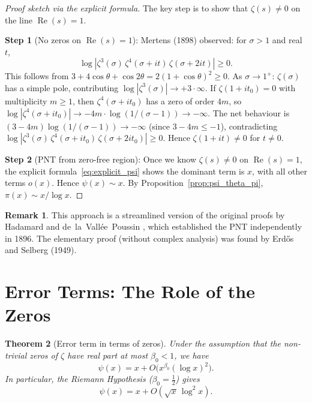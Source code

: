 \documentclass[12pt,a4paper]{amsart}
\newtheorem{theorem}{Theorem}[section]
\theoremstyle{definition}
\newtheorem{remark}[theorem]{Remark}
\DeclareMathOperator{\Re}{Re}
\begin{document}
\begin{proof}[Proof sketch via the explicit formula]
The key step is to show that $\zeta(s) \ne 0$ on the line $\Re(s) = 1$.

\textbf{Step 1} (No zeros on $\Re(s) = 1$):
Mertens (1898) observed: for $\sigma > 1$ and real $t$,
\[
  \log|\zeta^3(\sigma)\,\zeta^4(\sigma+it)\,\zeta(\sigma+2it)| \ge 0.
\]
This follows from $3 + 4\cos\theta + \cos 2\theta = 2(1+\cos\theta)^2 \ge 0$.
As $\sigma \to 1^+$: $\zeta(\sigma)$ has a simple pole, contributing
$\log|\zeta^3(\sigma)| \to +3\cdot\infty$. If $\zeta(1+it_0) = 0$ with
multiplicity $m \geq 1$, then $\zeta^4(\sigma+it_0)$ has a zero of order $4m$,
so $\log|\zeta^4(\sigma+it_0)| \to -4m \cdot \log(1/(\sigma-1)) \to -\infty$.
The net behaviour is $(3 - 4m)\log(1/(\sigma-1)) \to -\infty$ (since $3-4m \leq -1$),
contradicting $\log|\zeta^3(\sigma)\,\zeta^4(\sigma+it_0)\,\zeta(\sigma+2it_0)| \ge 0$.
Hence $\zeta(1+it) \ne 0$ for $t \ne 0$.

\textbf{Step 2} (PNT from zero-free region):
Once we know $\zeta(s) \ne 0$ on $\Re(s) = 1$, the explicit
formula~\eqref{eq:explicit_psi} shows the dominant term is $x$,
with all other terms $o(x)$.  Hence $\psi(x) \sim x$.
By Proposition~\ref{prop:psi_theta_pi}, $\pi(x) \sim x/\log x$.
\end{proof}

\begin{remark}
This approach is a streamlined version of the original proofs by
Hadamard \cite{Hadamard1896} and de~la~Vall\'ee~Poussin \cite{Poussin1896},
which established the PNT independently in 1896.
The elementary proof (without complex analysis) was found by
Erd\H{o}s and Selberg (1949).
\end{remark}

\section{Error Terms: The Role of the Zeros}

\begin{theorem}[Error term in terms of zeros]
\label{thm:error_term}
Under the assumption that the non-trivial zeros of $\zeta$ have real part
at most $\beta_0 < 1$, we have
\[
  \psi(x) = x + O\!\bigl(x^{\beta_0}(\log x)^2\bigr).
\]
In particular, the Riemann Hypothesis ($\beta_0 = \tfrac{1}{2}$) gives
\[
  \psi(x) = x + O(\sqrt{x}\,\log^2 x).
\]
\end{theorem}
\end{document}
